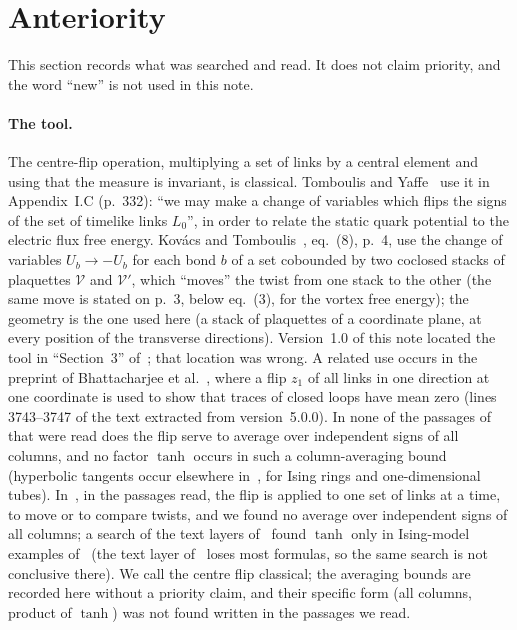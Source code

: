 \documentclass[11pt,a4paper]{article}
\theoremstyle{plain}
\theoremstyle{definition}
\theoremstyle{remark}
\numberwithin{equation}{section}
\begin{document}
\section{Anteriority}\label{sec:anteriority}
This section records what was searched and read. It does not claim priority, and the word ``new'' is not used in this note.

\paragraph{The tool.} The centre-flip operation, multiplying a set of links by a central element and using that the measure is invariant, is classical. Tomboulis and Yaffe~\cite{TY85} use it in Appendix~I.C (p.~332): ``we may make a change of variables which flips the signs of the set of timelike links $L_0$'', in order to relate the static quark potential to the electric flux free energy. Kov\'acs and Tomboulis~\cite{KT02}, eq.~(8), p.~4, use the change of variables $U_b\to-U_b$ for each bond $b$ of a set cobounded by two coclosed stacks of plaquettes $\mathcal V$ and $\mathcal V'$, which ``moves'' the twist from one stack to the other (the same move is stated on p.~3, below eq.~(3), for the vortex free energy); the geometry is the one used here (a stack of plaquettes of a coordinate plane, at every position of the transverse directions). Version~1.0 of this note located the tool in ``Section~3'' of~\cite{TY85}; that location was wrong. A related use occurs in the preprint of Bhattacharjee et al.~\cite{BB26}, where a flip $z_1$ of all links in one direction at one coordinate is used to show that traces of closed loops have mean zero (lines 3743--3747 of the text extracted from version~5.0.0). In none of the passages of~\cite{BB26} that were read does the flip serve to average over independent signs of all columns, and no factor $\tanh$ occurs in such a column-averaging bound (hyperbolic tangents occur elsewhere in~\cite{BB26}, for Ising rings and one-dimensional tubes). In~\cite{TY85,KT02,Kan}, in the passages read, the flip is applied to one set of links at a time, to move or to compare twists, and we found no average over independent signs of all columns; a search of the text layers of~\cite{KT02,Kan} found $\tanh$ only in Ising-model examples of~\cite{Kan} (the text layer of~\cite{TY85} loses most formulas, so the same search is not conclusive there). We call the centre flip classical; the averaging bounds are recorded here without a priority claim, and their specific form (all columns, product of $\tanh$) was not found written in the passages we read.
\end{document}
